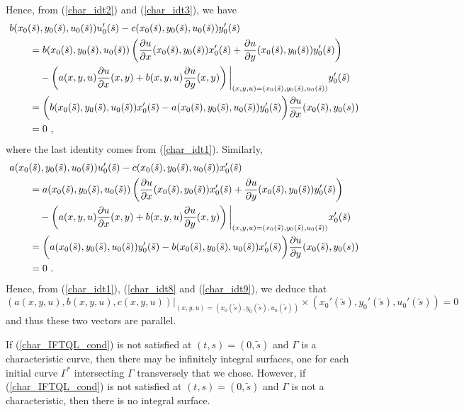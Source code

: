 \begin{rmk}
Hence, from (\ref{char_idt2}) and (\ref{char_idt3}), we have
\begin{align}
& b(x_0(\tilde{s}), y_0(\tilde{s}),u_0(\tilde{s})) u_0'(\tilde{s}) -
c(x_0(\tilde{s}), y_0(\tilde{s}),u_0(\tilde{s})) y_0'(\tilde{s}) \nonumber \\
&\qquad = b(x_0(\tilde{s}), y_0(\tilde{s}),u_0(\tilde{s}))
\left(\frac{\partial{u}}{\partial x}(x_0(\tilde{s}), y_0(\tilde{s}))x_0'(\tilde{s})
+\frac{\partial{u}}{\partial y}(x_0(\tilde{s}), y_0(\tilde{s}))y_0'(\tilde{s})\right) \nonumber \\
&\qquad \quad- \left(a(x, y, u)\frac{\partial{u}}{\partial x}(x,y) + b(x, y, u) \frac{\partial{u}}{\partial y}(x,y)
\right)\bigg|_{(x,y,u)= (x_0(\tilde{s}), y_0(\tilde{s}), u_0(\tilde{s}))}
y_0'(\tilde{s})
\nonumber \\
&\qquad = \bigg( b(x_0(\tilde{s}), y_0(\tilde{s}),u_0(\tilde{s}))x_0'(\tilde{s})
- a(x_0(\tilde{s}), y_0(\tilde{s}), u_0(\tilde{s}))y_0'(\tilde{s}) \bigg)
\frac{\partial{u}}{\partial x}(x_0(\tilde{s}), y_0(s)) \nonumber \\
&\qquad = 0 \ ,   \label{char_idt8}
\end{align}
where the last identity comes from (\ref{char_idt1}).  Similarly,
\begin{align}
& a(x_0(\tilde{s}), y_0(\tilde{s}),u_0(\tilde{s})) u_0'(\tilde{s}) -
c(x_0(\tilde{s}), y_0(\tilde{s}),u_0(\tilde{s})) x_0'(\tilde{s}) \nonumber \\
&\qquad = a(x_0(\tilde{s}), y_0(\tilde{s}),u_0(\tilde{s}))
\left(\frac{\partial{u}}{\partial x}(x_0(\tilde{s}), y_0(\tilde{s}))x_0'(\tilde{s})
+\frac{\partial{u}}{\partial y}(x_0(\tilde{s}), y_0(\tilde{s}))y_0'(\tilde{s})\right) \nonumber \\
&\qquad \quad- \left(a(x, y, u)\frac{\partial{u}}{\partial x}(x,y) + b(x, y, u) \frac{\partial{u}}{\partial y}(x,y)
\right)\bigg|_{(x,y,u)= (x_0(\tilde{s}), y_0(\tilde{s}),u_0(\tilde{s}))}
x_0'(\tilde{s}) \nonumber \\
&\qquad = \bigg( a(x_0(\tilde{s}), y_0(\tilde{s}),u_0(\tilde{s}))y_0'(\tilde{s})
- b(x_0(\tilde{s}), y_0(\tilde{s}), u_0(\tilde{s}))x_0'(\tilde{s}) \bigg)
\frac{\partial{u}}{\partial y}(x_0(\tilde{s}), y_0(s)) \nonumber \\
&\qquad = 0 \ .   \label{char_idt9}
\end{align}
Hence, from (\ref{char_idt1}), (\ref{char_idt8} and (\ref{char_idt9}),
we deduce that
\[
\left(a(x,y,u), b(x,y,u),  c(x,y,u)\right)
\big|_{(x,y,u)=(x_0(\tilde{s}), y_0(\tilde{s}), u_0(\tilde{s}))} \times
\left(x_0'(\tilde{s}), y_0'(\tilde{s}), u_0'(\tilde{s}) \right) = 0
\]
and thus these two vectors are parallel.

If (\ref{char_IFTQL_cond}) is not satisfied at $(t,s) = (0,\tilde{s})$
and $\Gamma$ is a characteristic curve, then there may be infinitely
integral surfaces, one for each initial curve $\displaystyle \Gamma^\ast$
intersecting $\Gamma$ transversely that we chose.
However, if (\ref{char_IFTQL_cond}) is not satisfied at
$(t,s) = (0,\tilde{s})$ and $\Gamma$ is not a characteristic, then there is
no integral surface.
\end{rmk}

